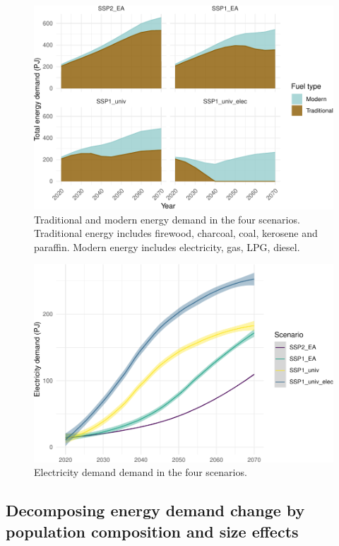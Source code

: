 \documentclass[
]{article}
\begin{document}
\begin{figure}

{\centering \includegraphics[width=0.8\linewidth]{../figures/energy-tradi-modern-1} 

}

\caption{Traditional and modern energy demand in the four scenarios. Traditional energy includes firewood, charcoal, coal, kerosene and paraffin. Modern energy includes electricity, gas, LPG, diesel.}\label{fig:energy-tradi-modern}
\end{figure}

\begin{figure}

{\centering \includegraphics[width=0.6\linewidth]{../figures/elec-1} 

}

\caption{Electricity demand demand in the four scenarios.}\label{fig:elec}
\end{figure}

\hypertarget{decomposing-energy-demand-change-by-population-composition-and-size-effects}{%
\subsection{Decomposing energy demand change by population composition and size effects}\label{decomposing-energy-demand-change-by-population-composition-and-size-effects}}
\end{document}
